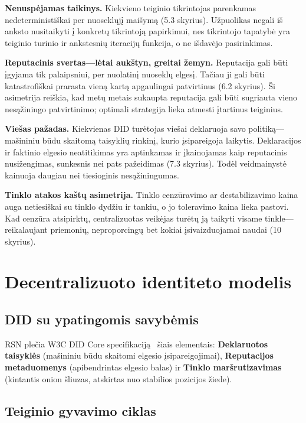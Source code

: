 \documentclass[11pt,a4paper,twocolumn]{article}
\begin{document}
\textbf{Nenuspėjamas taikinys.} Kiekvieno teiginio tikrintojas parenkamas nedeterministiškai per nuoseklųjį maišymą (5.3 skyrius). Užpuolikas negali iš anksto nusitaikyti į konkretų tikrintoją papirkimui, nes tikrintojo tapatybė yra teiginio turinio ir ankstesnių iteracijų funkcija, o ne išdavėjo pasirinkimas.

\textbf{Reputacinis svertas---lėtai aukštyn, greitai žemyn.} Reputacija gali būti įgyjama tik palaipsniui, per nuolatinį nuoseklų elgesį. Tačiau ji gali būti katastrofiškai prarasta vieną kartą apgaulingai patvirtinus (6.2 skyrius). Ši asimetrija reiškia, kad metų metais sukaupta reputacija gali būti sugriauta vieno nesąžiningo patvirtinimo; optimali strategija lieka atmesti įtartinus teiginius.

\textbf{Viešas pažadas.} Kiekvienas DID turėtojas viešai deklaruoja savo politiką---mašininiu būdu skaitomą taisyklių rinkinį, kurio įsipareigoja laikytis. Deklaracijos ir faktinio elgesio neatitikimas yra aptinkamas ir įkainojamas kaip reputacinis nusižengimas, sunkesnis nei pats pažeidimas (7.3 skyrius). Todėl veidmainystė kainuoja daugiau nei tiesioginis nesąžiningumas.

\textbf{Tinklo atakos kaštų asimetrija.} Tinklo cenzūravimo ar destabilizavimo kaina auga netiesiškai su tinklo dydžiu ir tankiu, o jo toleravimo kaina lieka pastovi. Kad cenzūra atsipirktų, centralizuotas veikėjas turėtų ją taikyti visame tinkle---reikalaujant priemonių, neproporcingų bet kokiai įsivaizduojamai naudai (10 skyrius).

\section{Decentralizuoto identiteto modelis}

\subsection{DID su ypatingomis savybėmis}

RSN plečia W3C DID Core specifikaciją~\cite{did2022} šiais elementais: \textbf{Deklaruotos taisyklės} (mašininiu būdu skaitomi elgesio įsipareigojimai), \textbf{Reputacijos metaduomenys} (apibendrintas elgesio balas) ir \textbf{Tinklo maršrutizavimas} (kintantis onion šliuzas, atskirtas nuo stabilios pozicijos žiede).

\subsection{Teiginio gyvavimo ciklas}
\end{document}
